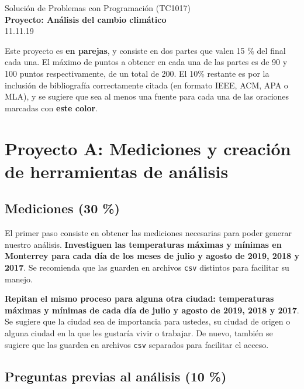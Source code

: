 \documentclass[]{article}
\theoremstyle{definition}
\newcommand{\markthis}[1]{{\color{blue}\textbf{#1}}}
\begin{document}
\begin{center}
{\huge Solución de Problemas con Programación (TC1017)}\\[1.5ex]
{\large \textbf{Proyecto: Análisis del cambio climático}\\[1.5ex] %
11.11.19} %
\end{center}

\vspace{0.2 cm}

{%
\small
Este proyecto es \textbf{en parejas}, y consiste en dos partes que valen 15 \% del final cada una.
El máximo de puntos a obtener en cada una de las partes es de 90 y 100 puntos respectivamente, de un total de 200.
El 10\% restante es por la inclusión de bibliografía correctamente citada (en formato IEEE, ACM, APA o MLA), y se sugiere que sea al menos una fuente para cada una de las oraciones marcadas con \markthis{este color}.
}

\section{Proyecto A: Mediciones y creación de herramientas de análisis}

\subsection{Mediciones (30 \%)}

El primer paso consiste en obtener las mediciones necesarias para poder generar nuestro análisis.
\markthis{Investiguen las temperaturas {\large máximas y mínimas} en Monterrey para cada día de los meses de julio y agosto de 2019, 2018 y 2017}.
Se recomienda que las guarden en archivos \texttt{csv} distintos para facilitar su manejo.

\bigskip

\markthis{Repitan el mismo proceso para alguna otra ciudad: temperaturas máximas y mínimas de cada día de julio y agosto de 2019, 2018 y 2017}.
Se sugiere que la ciudad sea de importancia para ustedes, su ciudad de origen o alguna ciudad en la que les gustaría vivir o trabajar.
De nuevo, también se sugiere que las guarden en archivos \texttt{csv} separados para facilitar el acceso.

\subsection{Preguntas previas al análisis (10 \%)}
\end{document}
